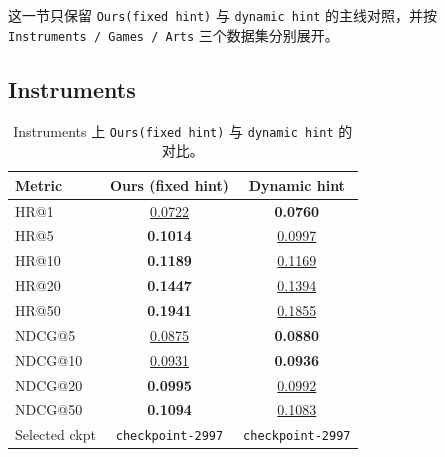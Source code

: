 \documentclass[11pt,a4paper]{ctexart}
\begin{document}
这一节只保留 \texttt{Ours(fixed hint)} 与 \texttt{dynamic hint} 的主线对照，并按 \texttt{Instruments / Games / Arts} 三个数据集分别展开。

\FloatBarrier

\subsection{Instruments}

\begin{table}[H]
\centering
\scriptsize
\setlength{\tabcolsep}{4pt}
\renewcommand{\arraystretch}{1.08}
\begin{tabular}{lcc}
\toprule
Metric & Ours (fixed hint) & Dynamic hint \\
\midrule
HR@1 & \underline{0.0722} & \textbf{0.0760} \\
HR@5 & \textbf{0.1014} & \underline{0.0997} \\
HR@10 & \textbf{0.1189} & \underline{0.1169} \\
HR@20 & \textbf{0.1447} & \underline{0.1394} \\
HR@50 & \textbf{0.1941} & \underline{0.1855} \\
NDCG@5 & \underline{0.0875} & \textbf{0.0880} \\
NDCG@10 & \underline{0.0931} & \textbf{0.0936} \\
NDCG@20 & \textbf{0.0995} & \underline{0.0992} \\
NDCG@50 & \textbf{0.1094} & \underline{0.1083} \\
\midrule
Selected ckpt & \texttt{checkpoint-2997} & \texttt{checkpoint-2997} \\
\bottomrule
\end{tabular}
\caption{Instruments 上 \texttt{Ours(fixed hint)} 与 \texttt{dynamic hint} 的对比。}
\label{tab:genrec-only-instruments-hint-comparison}
\end{table}
\end{document}
